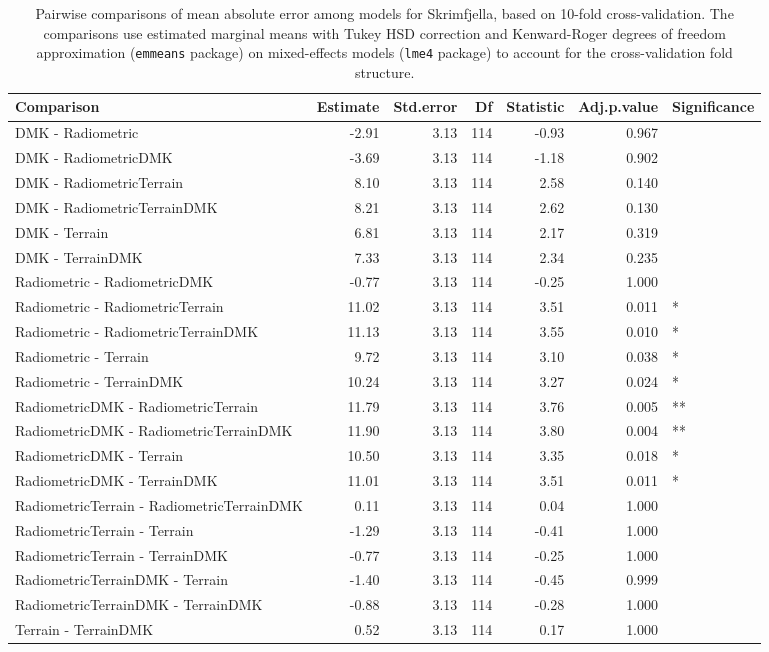 \documentclass[soil, manuscript]{copernicus}
\begin{document}
\begin{table}[h]

\caption{\label{tab:pairwiseSkrimMAE}Pairwise comparisons of mean absolute error among models for Skrimfjella, based on 10-fold cross-validation. The comparisons use estimated marginal means with Tukey HSD correction and Kenward-Roger degrees of freedom approximation (\texttt{emmeans} package) on mixed-effects models (\texttt{lme4} package) to account for the cross-validation fold structure.}
\centering
\begin{tabular}[t]{lrrrrrl}
\hline
Comparison & Estimate & Std.error & Df & Statistic & Adj.p.value & Significance\\
\hline
DMK - Radiometric & -2.91 & 3.13 & 114 & -0.93 & 0.967 & \\
DMK - RadiometricDMK & -3.69 & 3.13 & 114 & -1.18 & 0.902 & \\
DMK - RadiometricTerrain & 8.10 & 3.13 & 114 & 2.58 & 0.140 & \\
DMK - RadiometricTerrainDMK & 8.21 & 3.13 & 114 & 2.62 & 0.130 & \\
DMK - Terrain & 6.81 & 3.13 & 114 & 2.17 & 0.319 & \\
DMK - TerrainDMK & 7.33 & 3.13 & 114 & 2.34 & 0.235 & \\
Radiometric - RadiometricDMK & -0.77 & 3.13 & 114 & -0.25 & 1.000 & \\
Radiometric - RadiometricTerrain & 11.02 & 3.13 & 114 & 3.51 & 0.011 & *\\
Radiometric - RadiometricTerrainDMK & 11.13 & 3.13 & 114 & 3.55 & 0.010 & *\\
Radiometric - Terrain & 9.72 & 3.13 & 114 & 3.10 & 0.038 & *\\
Radiometric - TerrainDMK & 10.24 & 3.13 & 114 & 3.27 & 0.024 & *\\
RadiometricDMK - RadiometricTerrain & 11.79 & 3.13 & 114 & 3.76 & 0.005 & **\\
RadiometricDMK - RadiometricTerrainDMK & 11.90 & 3.13 & 114 & 3.80 & 0.004 & **\\
RadiometricDMK - Terrain & 10.50 & 3.13 & 114 & 3.35 & 0.018 & *\\
RadiometricDMK - TerrainDMK & 11.01 & 3.13 & 114 & 3.51 & 0.011 & *\\
RadiometricTerrain - RadiometricTerrainDMK & 0.11 & 3.13 & 114 & 0.04 & 1.000 & \\
RadiometricTerrain - Terrain & -1.29 & 3.13 & 114 & -0.41 & 1.000 & \\
RadiometricTerrain - TerrainDMK & -0.77 & 3.13 & 114 & -0.25 & 1.000 & \\
RadiometricTerrainDMK - Terrain & -1.40 & 3.13 & 114 & -0.45 & 0.999 & \\
RadiometricTerrainDMK - TerrainDMK & -0.88 & 3.13 & 114 & -0.28 & 1.000 & \\
Terrain - TerrainDMK & 0.52 & 3.13 & 114 & 0.17 & 1.000 & \\
\hline
\end{tabular}
\end{table}
\clearpage
\end{document}
